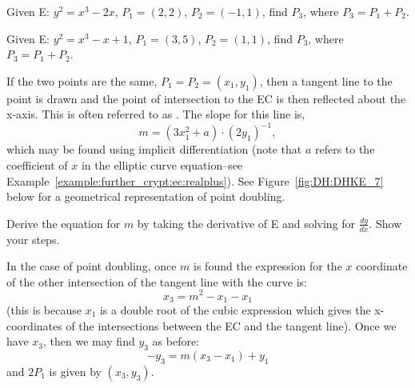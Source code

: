 \begin{exercise}{} Given E: $y^2 = x^3 - 2x$, $P_1 = (2, 2)$, $P_2 = (-1, 1)$, find $P_3$, where $P_3 = P_1 + P_2$.
\end{exercise}

\begin{exercise}{} Given E: $y^2 = x^3 - x + 1$, $P_1 = (3, 5)$, $P_2 = (1, 1)$, find $P_3$, where $P_3 = P_1 + P_2$.
\end{exercise}

If the two points are the same, $P_1 = P_2 = (x_1,y_1)$, then a tangent line to the point is drawn and the point of intersection to the EC is then reflected about the x-axis.  This is often referred to as . The slope for this line is, 
\[m = (3x_1^2 + a) \cdot (2y_1)^{-1},\] 
which may be found using implicit differentiation (note that $a$ refers to the coefficient of $x$ in the elliptic curve equation--see Example~\ref{example:further_crypt:ec:realplus}).  See Figure~\ref{fig:DH:DHKE_7} below for a geometrical representation of point doubling.

\begin{exercise}{}
Derive the equation for $m$ by taking the derivative of E and solving for $\frac{dy}{dx}$. Show your steps.
\end{exercise}

In the case of point doubling, once $m$ is found the expression for  the $x$ coordinate of the other intersection of the tangent line with the curve is:
\[ x_3 = m^2 - x_1 - x_1\]
(this is because $x_1$ is a double root of the cubic expression which gives the x-coordinates of the intersections between the EC and the tangent line). Once we have $x_3$, then we may find $y_3$ as before:
\[ -y_3 = m(x_3-x_1) + y_1 \]
and $2P_1$ is given by $(x_3,y_3)$.

